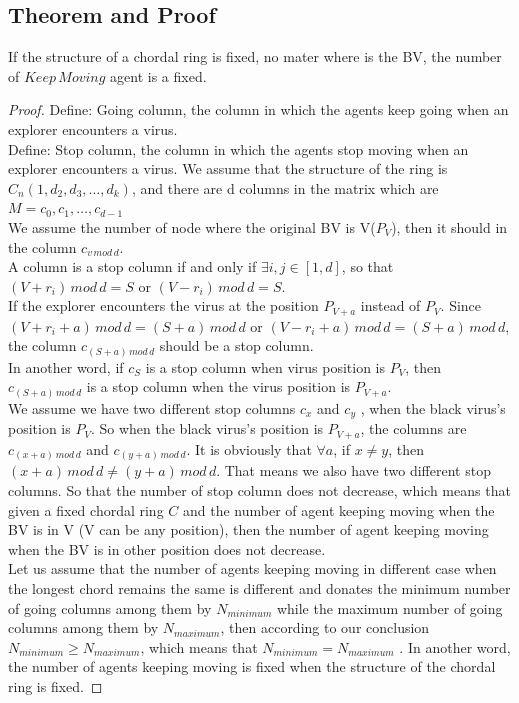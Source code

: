 \subsection{Theorem and Proof}
\begin{theorem}
If the structure of a chordal ring is fixed, no mater where is the BV, the number of $Keep\,Moving$ agent is a fixed.
\end{theorem}
\begin{proof}


Define: Going column, the column in which the agents keep going when an explorer encounters a virus.\\
Define: Stop column, the column in which the agents stop moving when an explorer encounters a virus.
We assume that the structure of the ring is $C_n(1, d_2, d_3,\dots, d_k)$, and there are d columns in the matrix which are $M={c_0,c_1,\dots, c_{d-1}}$\\
We assume the number of node where the original BV is V($P_V$), then it should in the column $c_{v\,mod\,d}$.\\
A column  is a stop column if and only if $\exists i,j\in [1,d]$, so that $(V+r_i)\,mod\,d=S$ or $(V-r_i)\,mod\,d=S$.\\
If the explorer encounters the virus at the position $P_{V+a}$ instead of $P_V$. Since $(V+r_i+a)\,mod\,d=(S+a)\,mod\,d$ or $(V-r_i+a)\,mod\,d=(S+a)\,mod\,d$, the column $c_{(S+a)\,mod\,d}$ should be a stop column.\\
In another word, if $c_S$ is a stop column when virus position is $P_V$, then $c_{(S+a)\,mod\,d}$ is a stop column when the virus position is $P_{V+a}$.\\
We assume we have two different stop columns $c_x$ and $c_y$ , when the black virus's position is $P_V$.  So when the black virus's position is $P_{V+a}$, the columns are $c_{(x+a)\,mod\,d}$ and $c_{(y+a)\,mod\,d}$. It is obviously that $\forall a$, if $x\neq y$, then $(x+a)\,mod\,d\neq(y+a)\,mod\,d$. That means we also have two different stop columns. So that the number of stop column does not decrease, which means that given a fixed chordal ring $C$ and the number of agent keeping moving when the BV is in V (V can be any position), then the number of agent keeping moving when the BV is in other position does not decrease.\\
Let us assume that the number of agents keeping moving in different case when the longest chord remains the same is different and donates the minimum number of going columns among them by $N_{minimum}$ while the maximum number of going columns among them by $N_{maximum}$, then according to our conclusion $N_{minimum}\geq N_{maximum}$, which means that $N_{minimum}= N_{maximum}$ . In another word, the number of agents keeping moving is fixed when the structure of the chordal ring is fixed. 
\end{proof}

